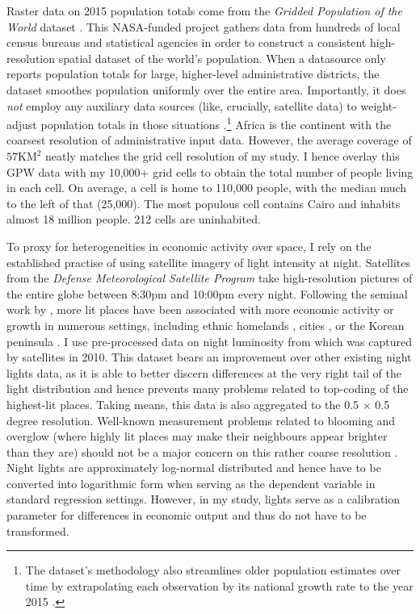 \documentclass[11pt, oneside]{article}   	%
\begin{document}
Raster data on 2015 population totals come from the \textit{Gridded Population of the World} dataset \citep[GPW,][]{socioeconomic_data_and_applications_center_gridded_2016}. This NASA-funded project gathers data from hundreds of local census bureaus and statistical agencies in order to construct a consistent high-resolution spatial dataset of the world's population. When a datasource only reports population totals for large, higher-level administrative districts, the dataset smoothes population uniformly over the entire area. Importantly, it does \emph{not} employ any auxiliary data sources (like, crucially, satellite data) to weight-adjust population totals in those situations \citep{Doxsey-Whitfield_TakingAdvantageImproved_2015}.\footnote{The dataset's methodology also streamlines older population estimates over time by extrapolating each observation by its national growth rate to the year 2015 \citep{Doxsey-Whitfield_TakingAdvantageImproved_2015}.} Africa is the continent with the coarsest resolution of administrative input data. However, the average coverage of $57\textrm{KM}^{2}$ neatly matches the grid cell resolution of my study. I hence overlay this GPW data with my 10,000+ grid cells to obtain the total number of people living in each cell. On average, a cell is home to 110,000 people, with the median much to the left of that (25,000). The most populous cell contains Cairo and inhabits almost 18 million people. 212 cells are uninhabited.

To proxy for heterogeneities in economic activity over space, I rely on the established practise of using satellite imagery of light intensity at night. Satellites from the \textit{Defense Meteorological Satellite Program} take high-resolution pictures of the entire globe between 8:30pm and 10:00pm every night. Following the seminal work by \cite{henderson_measuring_2012}, more lit places have been associated with more economic activity or growth in numerous settings, including ethnic homelands \citep{michalopoulos_national_2014}, cities \citep{storeygard_farther_2016,Kocornik-Mina_Floodedcities_2015}, or the Korean peninsula \citep{Lee_InternationalIsolationRegional_2016}. I use pre-processed data on night luminosity from \cite{henderson_global_2018} which was captured by satellites in 2010. This dataset bears an improvement over other existing night lights data, as it is able to better discern differences at the very right tail of the light distribution and hence prevents many problems related to top-coding of the highest-lit places. Taking means, this data is also aggregated to the 0.5 $\times$ 0.5 degree resolution. Well-known measurement problems related to blooming and overglow (where highly lit places may make their neighbours appear brighter than they are) should not be a major concern on this rather coarse resolution \citep{michalopoulos_spatial_2018}. Night lights are approximately log-normal distributed and hence have to be converted into logarithmic form when serving as the dependent variable in standard regression settings. However, in my study, lights serve as a calibration parameter for differences in economic output and thus do not have to be transformed.
\end{document}
